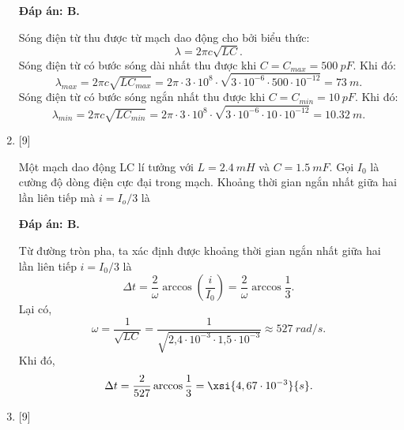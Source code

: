 \begin{enumerate}[label=\bfseries Câu \arabic*:]
	\loigiai
	{		\textbf{Đáp án: B.}
		
	Sóng điện từ thu được từ mạch dao động cho bởi biểu thức:
    $$
    \lambda = 2\pi c \sqrt{LC}.
    $$ 
Sóng điện từ có bước sóng dài nhất thu được khi $C = C_{max} =\SI{500}{pF}$. Khi đó:
    $$
    \lambda_{max} = 2\pi c \sqrt{LC_{max}} = 2\pi \cdot 3\cdot10^{8} \cdot \sqrt{3\cdot10^{-6} \cdot 500\cdot10^{-12}} = \SI{73}{m}.
    $$
Sóng điện từ có bước sóng ngắn nhất thu được khi $C = C_{min} =\SI{10}{pF}$. Khi đó:
    $$
    \lambda_{min} = 2\pi c \sqrt{LC_{min}} = 2\pi \cdot 3\cdot10^{8} \cdot \sqrt{3\cdot10^{-6} \cdot 10\cdot10^{-12}} = \SI{10,32}{m}.
    $$
		
	}

	\item {} [9]
	
	\cauhoi
	{Một mạch dao động LC lí tưởng với $L = \SI{2,4}{mH}$ và $C = \SI{1,5}{mF}$. Gọi $I_0$ là cường độ dòng điện cực đại trong mạch. Khoảng thời gian ngắn nhất giữa hai lần liên tiếp mà $i = I_o /3$ là
	}
	
	\loigiai
	{		\textbf{Đáp án: B.}

Từ đường tròn pha, ta xác định được khoảng thời gian ngắn nhất giữa hai lần liên tiếp $i=I_{0} / 3$ là
$$
\Delta t=\dfrac{2}{\omega} \arccos \left(\dfrac{i}{I_{0}}\right)=\dfrac{2}{\omega} \arccos \dfrac{1}{3}.
$$
Lại có,
$$
\omega=\dfrac{1}{\sqrt{L C}}=\dfrac{1}{\sqrt{\text{2,4}\cdot10^{-3} \cdot \text{1,5} \cdot 10^{-3}}} \approx \SI{527}{rad/s}.
$$
Khi đó,
$$
\Delta t=\dfrac{2}{527} \arccos \dfrac{1}{3}= \xsi{4,67\cdot10^{-3}}{s}.
$$

		
	}

	\item {} [9]
	

\end{enumerate}
